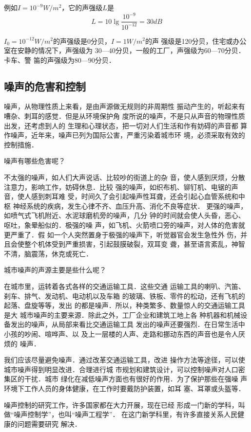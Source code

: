 例如$I=10^{-9}{ W}/{ m^2}$，它的声强级$L$是
\[L=10\lg \frac{10^{-9}}{10^{-12}}=30{ dB} \]

$I_0=10^{-12}{ W}/{ m^2}$的声强级是0分贝，$I=1{ W}/{ m^2}$的声
强级是120分贝，住宅或办公室在安静的情况下，声强级为
30—40分贝，一般的工厂，声强级为60—70分贝．卡车、警
笛的声强级为80—90分贝．

\subsection{噪声的危害和控制}
噪声，从物理性质上来看，是由声源做无规则的非周期性
振动产生的，听起来有嘈杂、刺耳的感觉．但是从环境保护角
度所说的噪声，不是只从声音的物理性质出发，还考虑到人的
生理和心理状态，把一切对人们生活和作有妨碍的声音都
算作噪声，近年来，噪声已列为国际公害，严重污染着城市环
境，必须采取有效的控制措施．

噪声有哪些危害呢？

不太强的噪声，如人们大声说话、比较吵的街道上的杂
音，使人感到厌烦，分散注意力，影响工作，妨碍休息．比较
强的噪声，如织布机、铆钉机、电锯的声音，使人感到刺耳难
受，时间久了会引起噪声性耳聋，还会引起心血管系统和中枢
神经系统的疾病，发生心律不齐、血压升高、消化不良等症状．
更强的噪声，如喷气式飞机附近、水泥球磨机旁的噪声，几分
钟的时间就会使人头昏，恶心、呕吐，象晕船似的．极强的噪
声，如飞机、火箭喷口旁的噪声，对人体的危害就更严重了．假
如一个人突然置身于极强的噪声下，听觉器官会发生急性外
伤，并且会使整个机体受到严重损害，引起鼓膜破裂，双耳变
聋，甚至语言紊乱，神智不清，脑震荡，休克或死亡．

城市噪声的声源主要是些什么呢？

在城市里，运转着各式各样的交通运输工具．这些交通
运输工具的喇叭、汽笛、刹车、排气、发动机、电动机以及车箱
的玻璃、铁板、零件的松动，还有飞机的起落、盘旋等等，发出
的都是噪声．所以，种类繁多、数量惊人的交通运输工具是大
城市噪声的主要来源．除此之外，工厂企业和建筑工地上各
种机器和机械设备发出的噪声，从局部来看比交通运输工具
发出的噪声还要强烈．在日常生活中小孩的吵闹、喧哗声、以
及上一层楼的人声、走路和挪动东西的声音也是令人厌烦的
噪声．

我们应该尽量避免噪声．通过改革交通运输工具，改进
操作方法等途径，可以使城市噪声得到明显改进．合理进行城
市规划和建筑设计，可以控制噪声对人口密集区的干扰．城市
绿化在减低噪声方面也有很好的作用．为了保护那些在强噪
声环境下工作人员的身体健康，在工作时要戴防护装置，如耳
塞、耳罩或头盔等．

噪声控制的研究工作，许多国家都在大力开展，现在已经
形成一门新的学科，叫做“噪声控制学”，也叫“噪声工程学”．
在这门新学科里，有许多直接关系人民健康的问题需要研究
解决．

